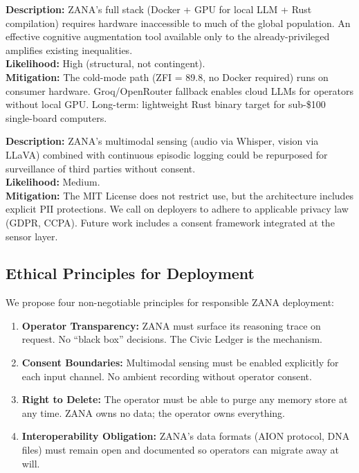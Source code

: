 \documentclass[12pt,a4paper]{article}
\begin{document}
\begin{tcolorbox}[riskbox, title={Risk S3: Digital Divide Amplification}]
\textbf{Description:} ZANA's full stack (Docker + GPU for local LLM + Rust compilation)
requires hardware inaccessible to much of the global population. An effective cognitive
augmentation tool available only to the already-privileged amplifies existing inequalities.\\
\textbf{Likelihood:} High (structural, not contingent).\\
\textbf{Mitigation:} The cold-mode path (ZFI = 89.8, no Docker required) runs on
consumer hardware. Groq/OpenRouter fallback enables cloud LLMs for operators without
local GPU. Long-term: lightweight Rust binary target for sub-\$100 single-board computers.
\end{tcolorbox}

\begin{tcolorbox}[riskbox, title={Risk S4: Dual-Use for Surveillance}]
\textbf{Description:} ZANA's multimodal sensing (audio via Whisper, vision via LLaVA)
combined with continuous episodic logging could be repurposed for surveillance of
third parties without consent.\\
\textbf{Likelihood:} Medium.\\
\textbf{Mitigation:} The MIT License does not restrict use, but the architecture includes
explicit PII protections. We call on deployers to adhere to applicable privacy law
(GDPR, CCPA). Future work includes a consent framework integrated at the sensor layer.
\end{tcolorbox}

\subsection{Ethical Principles for Deployment}

We propose four non-negotiable principles for responsible ZANA deployment:

\begin{enumerate}[leftmargin=*, label=\textbf{P\arabic*.}]
  \item \textbf{Operator Transparency:} ZANA must surface its reasoning trace on request.
    No ``black box'' decisions. The Civic Ledger is the mechanism.
  \item \textbf{Consent Boundaries:} Multimodal sensing must be enabled explicitly for each
    input channel. No ambient recording without operator consent.
  \item \textbf{Right to Delete:} The operator must be able to purge any memory store at
    any time. ZANA owns no data; the operator owns everything.
  \item \textbf{Interoperability Obligation:} ZANA's data formats (AION protocol, DNA files)
    must remain open and documented so operators can migrate away at will.
\end{enumerate}
\end{document}

